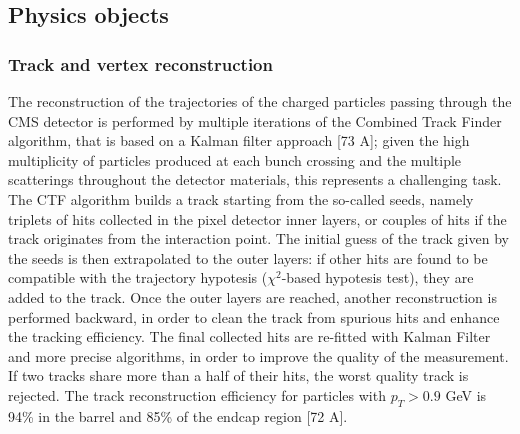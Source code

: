 \subsection{Physics objects}

\subsubsection{Track and vertex reconstruction}
The reconstruction of the trajectories of the charged particles passing through the CMS detector is performed by multiple iterations of the Combined Track Finder algorithm, that is based on a Kalman filter approach [73 A]; given the high multiplicity of particles produced at each bunch crossing and the multiple scatterings throughout the detector materials, this represents a challenging task. The CTF algorithm builds a track starting from the so-called seeds, namely triplets of hits collected in the pixel detector inner layers, or couples of hits if the track originates from the interaction point. The initial guess of the track given by the seeds is then extrapolated to the outer layers: if other hits are found to be compatible with the trajectory hypotesis ($\chi^2$-based hypotesis test), they are added to the track. Once the outer layers are reached, another reconstruction is performed backward, in order to clean the track from spurious hits and enhance the tracking efficiency. The final collected hits are re-fitted with Kalman Filter and more precise algorithms, in order to improve the quality of the measurement. If two tracks share more than a half of their hits, the worst quality track is rejected. The track reconstruction efficiency for particles with $p_T >0.9$ GeV is 94\% in the barrel and 85\% of the endcap region [72 A].

